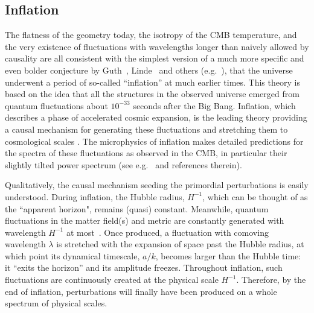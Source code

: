 \documentclass[psfig,11pt]{article}
\begin{document}
\subsection{Inflation}

\label{sec:introinflation}

The flatness of the geometry today, the isotropy of the CMB temperature, and the very existence of fluctuations with wavelengths longer than naively allowed by causality are all consistent with the simplest version of a much more specific and even bolder conjecture by Guth~\cite{Guth1981}, Linde~\cite{Linde1982a} and others (e.g.~\cite{%
 Mukhanov:1981xt, Sato1981, Hawking1982, Starobinsky1982, Albrecht1982, %
  Bardeen1983%
  }), that the universe underwent a period of so-called ``inflation'' at much earlier times. This theory is based on the idea that all the structures in the observed universe emerged from quantum fluctuations about $10^{-33}$ seconds after the Big Bang. Inflation, which describes a phase of accelerated cosmic expansion, is the leading theory providing a causal mechanism for generating these fluctuations and stretching them to cosmological scales%
. The microphysics of inflation makes detailed predictions for the spectra of these fluctuations as observed in the CMB, in particular their slightly tilted power spectrum (see e.g.~\cite{Malik2008, Gordon2000} and references therein).

Qualitatively, the causal mechanism seeding the primordial perturbations is easily understood. During inflation, the Hubble radius, $H^{-1}$, which can be thought of as the ``apparent horizon", remains (quasi) constant. Meanwhile, quantum fluctuations in the matter field(s) and metric are constantly generated with wavelength $H ^{-1}$ at most~\cite{BirrellsBook1984}. Once produced, a fluctuation with comoving wavelength $\lambda$ is stretched with the expansion of space past the Hubble radius, at which point its dynamical timescale, $a/k$, becomes larger than the Hubble time: it ``exits the horizon'' and its amplitude freezes.  Throughout inflation, such fluctuations are continuously created at the physical scale $H^{-1}$. Therefore, by the end of inflation, perturbations will finally have been produced on a whole spectrum of physical scales.
\end{document}
